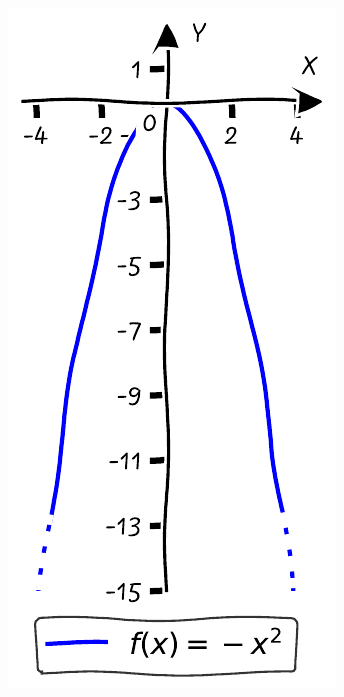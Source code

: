 \documentclass[nobib]{tufte-handout}
\begin{document}
\begin{figure}[h]
\begin{minipage}{0.19\textwidth}
    \label{fig:second}
  \end{minipage}\hfill
  \begin{minipage}{0.19\textwidth}
    \includegraphics[width=\linewidth]{./graphs/quadratic_func_flipped.pdf}

\end{minipage}
\end{figure}
\end{document}
